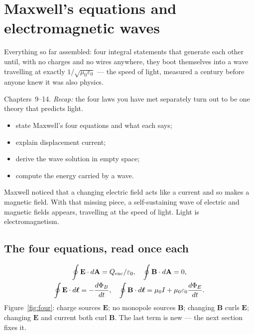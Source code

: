 \chapter{Maxwell's equations and electromagnetic waves}\label{ch:maxwell}

Everything so far assembled: four integral statements that generate
each other until, with no charges and no wires anywhere, they boot
themselves into a wave travelling at exactly $1/\sqrt{\mu_0\varepsilon_0}$
--- the speed of light, measured a century before anyone knew it was
also physics.

\begin{rulebox}
Chapters~9--14. \emph{Recap:} the four laws you have met separately turn out to be one theory that predicts light.
\end{rulebox}
\begin{wins}
\begin{itemize}
\item state Maxwell's four equations and what each says;
\item explain displacement current;
\item derive the wave solution in empty space;
\item compute the energy carried by a wave.
\end{itemize}
\end{wins}
\begin{principle}
Maxwell noticed that a changing electric field acts like a current and so makes a magnetic field. With that missing piece, a self-sustaining wave of electric and magnetic fields appears, travelling at the speed of light. Light is electromagnetism.
\end{principle}

\section{The four equations, read once each}\label{sec:max-four}

\begin{gather}
\oint\mathbf E\cdot d\mathbf A=Q_{\rm enc}/\varepsilon_0,\quad
\oint\mathbf B\cdot d\mathbf A=0,\nonumber\\
\oint\mathbf E\cdot d\boldsymbol\ell=-\frac{d\Phi_B}{dt},\quad
\oint\mathbf B\cdot d\boldsymbol\ell=\mu_0I+\mu_0\varepsilon_0\frac{d\Phi_E}{dt}.
\label{eq:maxwell}
\end{gather}
Figure~\ref{fig:four}: charge sources $\mathbf E$; no monopole sources
$\mathbf B$; changing $\mathbf B$ curls $\mathbf E$; changing
$\mathbf E$ and current both curl $\mathbf B$. The last term is new ---
the next section fixes it.

